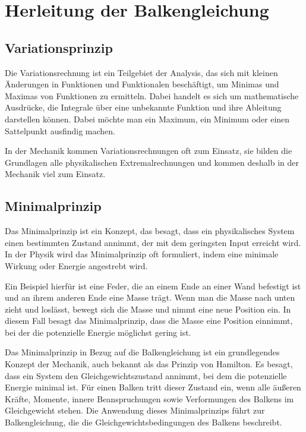 %
%
%
%
\section{Herleitung der Balkengleichung
	\label{balken:section:teil2}}
\subsection{Variationsprinzip}
Die Variationsrechnung ist ein Teilgebiet der Analysis, das sich mit kleinen Änderungen in Funktionen und Funktionalen beschäftigt, um Minimas und Maximas von Funktionen zu ermitteln.
Dabei handelt es sich um mathematische Ausdrücke, die Integrale über eine unbekannte Funktion und ihre Ableitung darstellen können.
Dabei möchte man ein Maximum, ein Minimum oder einen Sattelpunkt ausfindig machen.

In der Mechanik kommen Variationsrechnungen oft zum Einsatz, sie bilden die Grundlagen alle physikalischen Extremalrechnungen und kommen deshalb in der Mechanik viel zum Einsatz.

\subsection{Minimalprinzip}
Das Minimalprinzip ist ein Konzept, das besagt, dass ein physikalisches System einen bestimmten Zustand annimmt, der mit dem geringsten Input erreicht wird.
In der Physik wird das Minimalprinzip oft formuliert, indem eine minimale Wirkung oder Energie angestrebt wird.

Ein Beispiel hierfür ist eine Feder, die an einem Ende an einer Wand befestigt ist und an ihrem anderen Ende eine Masse trägt.
Wenn man die Masse nach unten zieht und loslässt, bewegt sich die Masse und nimmt eine neue Position ein. In diesem Fall besagt das Minimalprinzip, dass die Masse eine Position einnimmt, bei der die potenzielle Energie möglichst gering ist.

Das Minimalprinzip in Bezug auf die Balkengleichung ist ein grundlegendes Konzept der Mechanik, auch bekannt als das Prinzip von Hamilton.
Es besagt, dass ein System den Gleichgewichtszustand annimmt, bei dem die potenzielle Energie minimal ist.
Für einen Balken tritt dieser Zustand ein, wenn alle äußeren Kräfte, Momente, innere Beanspruchungen sowie Verformungen des Balkens im Gleichgewicht stehen.
Die Anwendung dieses Minimalprinzips führt zur Balkengleichung, die die Gleichgewichtsbedingungen des Balkens beschreibt.

